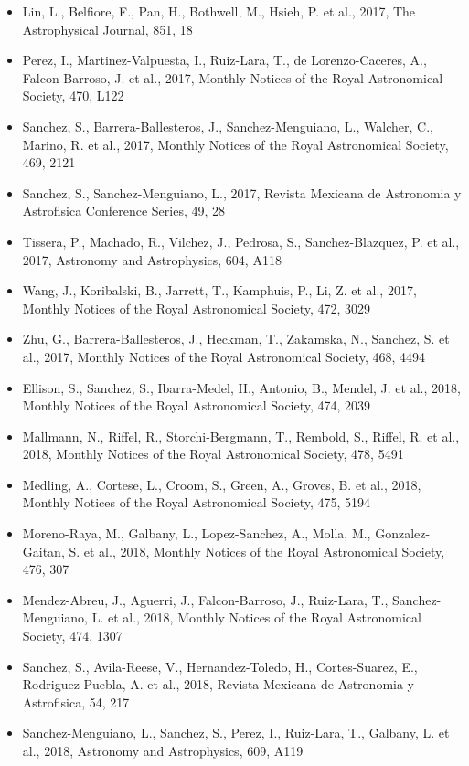 \documentclass{letter}
\begin{document}
\begin{enumerate}
\begin{itemize}
\item Lin, L., Belfiore, F., Pan, H., Bothwell, M., Hsieh, P. et al., 2017, The Astrophysical Journal, 851, 18
\item Perez, I., Martinez-Valpuesta, I., Ruiz-Lara, T., de Lorenzo-Caceres, A., Falcon-Barroso, J. et al., 2017, Monthly Notices of the Royal Astronomical Society, 470, L122
\item Sanchez, S., Barrera-Ballesteros, J., Sanchez-Menguiano, L., Walcher, C., Marino, R. et al., 2017, Monthly Notices of the Royal Astronomical Society, 469, 2121
\item Sanchez, S., Sanchez-Menguiano, L., 2017, Revista Mexicana de Astronomia y Astrofisica Conference Series, 49, 28
\item Tissera, P., Machado, R., Vilchez, J., Pedrosa, S., Sanchez-Blazquez, P. et al., 2017, Astronomy and Astrophysics, 604, A118
\item Wang, J., Koribalski, B., Jarrett, T., Kamphuis, P., Li, Z. et al., 2017, Monthly Notices of the Royal Astronomical Society, 472, 3029
\item Zhu, G., Barrera-Ballesteros, J., Heckman, T., Zakamska, N., Sanchez, S. et al., 2017, Monthly Notices of the Royal Astronomical Society, 468, 4494
\item Ellison, S., Sanchez, S., Ibarra-Medel, H., Antonio, B., Mendel, J. et al., 2018, Monthly Notices of the Royal Astronomical Society, 474, 2039
\item Mallmann, N., Riffel, R., Storchi-Bergmann, T., Rembold, S., Riffel, R. et al., 2018, Monthly Notices of the Royal Astronomical Society, 478, 5491
\item Medling, A., Cortese, L., Croom, S., Green, A., Groves, B. et al., 2018, Monthly Notices of the Royal Astronomical Society, 475, 5194
\item Moreno-Raya, M., Galbany, L., Lopez-Sanchez, A., Molla, M., Gonzalez-Gaitan, S. et al., 2018, Monthly Notices of the Royal Astronomical Society, 476, 307
\item Mendez-Abreu, J., Aguerri, J., Falcon-Barroso, J., Ruiz-Lara, T., Sanchez-Menguiano, L. et al., 2018, Monthly Notices of the Royal Astronomical Society, 474, 1307
\item Sanchez, S., Avila-Reese, V., Hernandez-Toledo, H., Cortes-Suarez, E., Rodriguez-Puebla, A. et al., 2018, Revista Mexicana de Astronomia y Astrofisica, 54, 217
\item Sanchez-Menguiano, L., Sanchez, S., Perez, I., Ruiz-Lara, T., Galbany, L. et al., 2018, Astronomy and Astrophysics, 609, A119

\end{itemize}
\end{enumerate}
\end{document}
